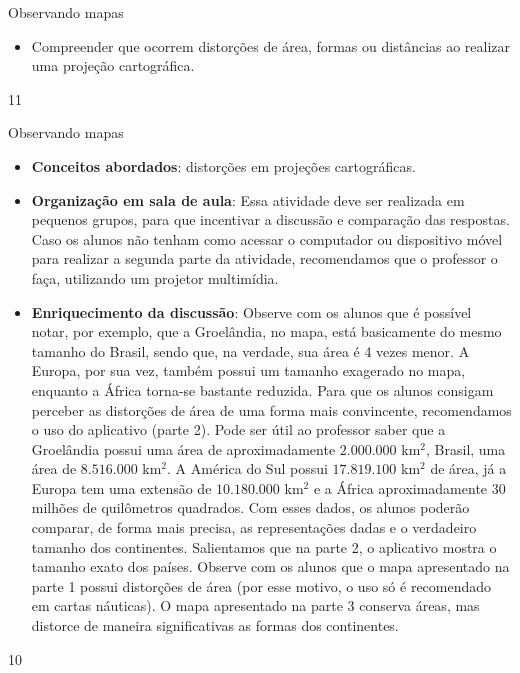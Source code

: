 \begin{objectives}{Observando mapas}
{
  \begin{itemize}
  \item Compreender que ocorrem distorções de área, formas ou distâncias ao realizar uma projeção cartográfica.
 
  \end{itemize}
}{1}{1}
\end{objectives}
\clearmargin
\begin{sugestions}{Observando mapas}
{
  \begin{itemize}
  \item  \textbf{Conceitos abordados}: distorções em projeções cartográficas.
  \item \textbf{Organização em sala de aula}: Essa atividade deve ser realizada em pequenos grupos, para que incentivar a discussão e comparação das respostas. Caso os alunos não tenham como acessar o computador ou dispositivo móvel para realizar a segunda parte da atividade, recomendamos que o professor o faça, utilizando um projetor multimídia.
  \item \textbf{Enriquecimento da discussão}:    Observe com os alunos que é possível notar, por exemplo, que a Groelândia, no mapa, está basicamente do mesmo tamanho do Brasil, sendo que, na verdade, sua área é 4 vezes menor. A Europa, por sua vez, também possui um tamanho exagerado no mapa, enquanto a África torna-se bastante reduzida. Para que os alunos consigam perceber as distorções de área de uma forma mais convincente, recomendamos o uso do aplicativo (parte 2). Pode ser útil ao professor saber que a Groelândia possui uma área de aproximadamente $2.000.000$ km$^{2}$, Brasil, uma área de $8.516.000$ km$^2$. A América do Sul possui $17.819.100$ km$^2$ de área, já a Europa tem uma extensão de $10.180.000$ km$^2$ e a África aproximadamente 30 milhões de quilômetros quadrados.  Com esses dados, os alunos poderão comparar, de forma mais precisa, as representações dadas e o verdadeiro tamanho dos continentes. Salientamos que na parte 2, o aplicativo mostra o tamanho exato dos países. Observe com os alunos que o mapa apresentado na parte 1 possui distorções de área (por esse motivo, o uso só é recomendado em cartas náuticas). O mapa apresentado na parte 3 conserva áreas, mas distorce de maneira significativas as formas dos continentes.

  \end{itemize}
}{1}{0}
\end{sugestions}
